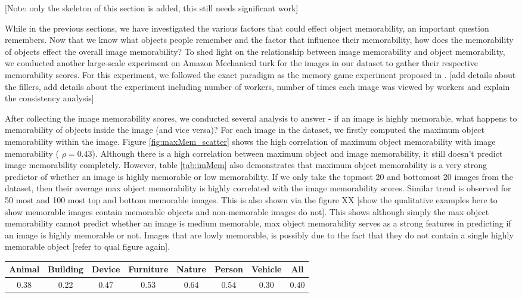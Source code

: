 [Note: only the skeleton of this section is added, this still needs significant work]

While in the previous sections, we have investigated the various factors that could effect object memorability, an important question remembers. Now that we know what objects people remember and the factor that influence their memorability, how does the memorability of objects effect the overall image memorability? To shed light on the relationship between image memorability and object memorability, we conducted another large-scale experiment on Amazon Mechanical turk for the images in our dataset to gather their respective memorability scores. For this experiment, we followed the exact paradigm as the memory game experiment proposed in \cite{isola11}. [add details about the fillers, add details about the experiment including number of workers, number of times each image was viewed by workers and explain the consistency analysis]

After collecting the image memorability scores, we conducted several analysis to answer - if an image is highly memorable, what happens to memorability of objects inside the image (and vice versa)? For each image in the dataset, we firstly computed the maximum object memorability within the image. Figure \ref{fig:maxMem_scatter} shows the high correlation of maximum object memorability with image memorability ( $\rho = 0.43$). Although there is a high correlation between maximum object and image memorability, it still doesn't predict image memorability completely. However, table \ref{tab:imMem} also demonstrates that maximum object memorability is a very strong predictor of whether an image is highly memorable or low memorability. If we only take the topmost 20 and bottomost 20 images from the dataset, then their average max object memorability is highly correlated with the image memorability scores. Similar trend is observed for 50 most and 100 most top and bottom memorable images. This is also shown via the figure XX [show the qualitative examples here to show memorable images contain memorable objects and non-memorable images do not]. This shows although simply the max object memorability cannot predict whether an image is medium memorable, max object memorability serves as a strong features in predicting if an image is highly memorable or not. Images that are lowly memorable, is possibly due to the fact that they do not contain a single highly memorable object [refer to qual figure again].

\begin{table}[t]
    \begin{tabular}{cccccccc}
    \hline
    Animal & Building & Device & Furniture & Nature & Person & Vehicle & All  \\ \hline
    0.38   & 0.22     & 0.47   & 0.53      & 0.64   & 0.54   & 0.30    & 0.40 \\ \hline
    \end{tabular}
\end{table}



